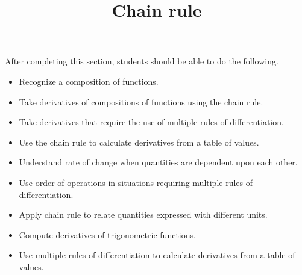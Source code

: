 \documentclass{ximera}
\title{Chain rule}
\begin{document}
\begin{abstract}
\end{abstract}

\maketitle

\begin{sectionOutcomes}

After completing this section, students should be able to do the following.

\begin{itemize}
	\item Recognize a composition of functions.
	\item Take derivatives of compositions of functions using the chain rule.
	\item Take derivatives that require the use of multiple rules of differentiation.
	\item Use the chain rule to calculate derivatives from a table of values.
	\item Understand rate of change when quantities are dependent upon each other.
	\item Use order of operations in situations requiring multiple rules of differentiation.
        \item Apply chain rule to relate quantities expressed with different units.
        \item Compute derivatives of trigonometric functions.
        \item Use multiple rules of differentiation to calculate derivatives from a table of values.
\end{itemize}

\end{sectionOutcomes}
\end{document}

